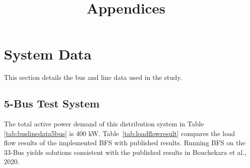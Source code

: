 \documentclass[12pt]{article}
\title{Appendices}
\date{}
\begin{document}
	
	\maketitle
	\tableofcontents

	\appendix
	\section{System Data}
	This section details the bus and line data used in the study.
	
	\subsection{5-Bus Test System}
	The total active power demand of this distribution system in Table \ref{tab:buslinedata5bus} is 400 kW. Table~\ref{tab:loadflowresult} compares the load flow results of the implemented BFS with published results. Running BFS on the 33-Bus yields solutions consistent with the published results in Bouchekara et al., 2020.
	
\end{document}
